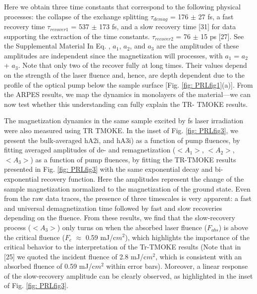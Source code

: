 Here we obtain three time constants that correspond to the following physical processes: the collapse of the exchange splitting $\tau_{demag}$ =  176 $\pm$ 27 fs, a fast recovery time $\tau_{recover1}$ = 537 $\pm$ 173 fs, and a slow recovery time [31] for data supporting the extraction of the time constants. $\tau_{recover2}$ = 76 $\pm$ 15 ps [27]. See the Supplemental Material In Eq. \label{eqn:1}, $a_1$, $a_2$, and $a_3$ are the amplitudes of these amplitudes are independent since the magnetization will processes, with $a_1$ = $a_2$ + $a_3$. Note that only two of the recover fully at long times. Their values depend on the strength of the laser fluence and, hence, are depth dependent due to the profile of the optical pump below the sample surface [Fig. \ref{fig: PRLfig1}(a)]. From the ARPES results, we map the dynamics in monolayers of the material—we can now test whether this understanding can fully explain the TR- TMOKE results.

The magnetization dynamics in the same sample excited by fs laser irradiation were also measured using TR TMOKE. In the inset of Fig. \ref{fig: PRLfig3}, we present the bulk-averaged hA2i, and hA3i) as a function of pump fluences, by fitting averaged amplitudes of de- and remagnetization ($<A_1>$, $<A_2>$, $<A_3>$) as a function of pump fluences, by fitting the TR-TMOKE results presented in Fig. \ref{fig: PRLfig3} with the same exponential decay and bi-exponential recovery function. Here the amplitudes represent the change of the sample magnetization normalized to the magnetization of the ground state. Even from the raw data traces, the presence of three timescales is very apparent: a fast and universal demagnetization time followed by fast and slow recoveries depending on the fluence.  From these results, we find that the slow-recovery process ($<A_3>$) only turns on when the absorbed laser fluence ($F_{abs}$) is above the critical fluence ($F_c$ $\approx$ 0.59 mJ/c$m^2$), which highlights the importance of the critical behavior to the interpretation of the Tr-TMOKE results (Note that in [25] we quoted the incident fluence of 2.8 mJ/c$m^2$, which is consistent with an absorbed fluence of 0.59 mJ/c$m^2$ within error bars). Moreover, a linear response of the slow-recovery amplitude  can be clearly observed, as highlighted in the inset of Fig. \ref*{fig: PRLfig3}.

